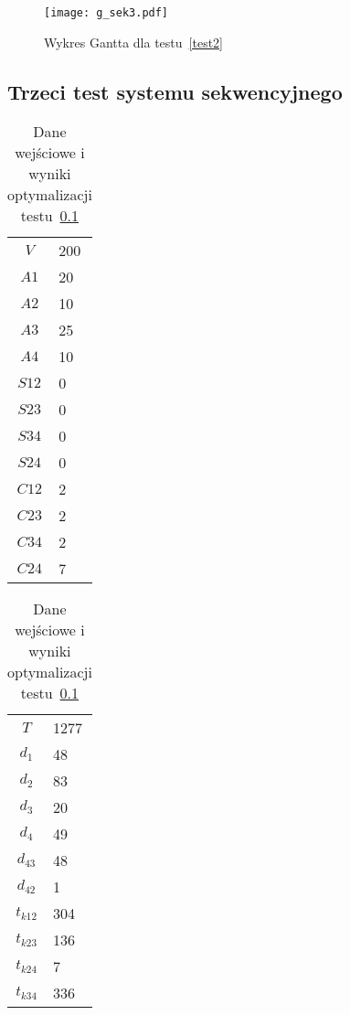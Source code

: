 \begin{figure}[H]
\centering
\texttt{[image: g\_sek3.pdf]}
\caption{Wykres Gantta dla testu~\ref{test2}}
\label{fig:res_2b}
\end{figure}



\subsection{Trzeci test systemu sekwencyjnego} \label{test3}

\begin{table}[H]
\begin{minipage}[b]{0.5\linewidth}
\centering
\begin{tabular}{c l}
$V$ & 200 \\
$A1$ & 20 \\
$A2$ & 10 \\
$A3$ & 25 \\
$A4$ & 10 \\
$S12$ & 0 \\
$S23$ & 0 \\
$S34$ & 0 \\
$S24$ & 0 \\
$C12$ & 2 \\
$C23$ & 2 \\
$C34$ & 2 \\
$C24$ & 7 \\
\end{tabular}
\end{minipage}
\hspace{0.5cm}
\begin{minipage}[b]{0.5\linewidth}
\centering
\begin{tabular}{c l}
$T$ & 1277 \\
$d_{1}$ & 48 \\
$d_{2}$ & 83 \\
$d_{3}$ & 20 \\
$d_{4}$ & 49 \\
$d_{43}$ & 48 \\
$d_{42}$ & 1 \\
$t_{k12}$ & 304 \\
$t_{k23}$ & 136 \\
$t_{k24}$ & 7 \\
$t_{k34}$ & 336 \\
\end{tabular}
\end{minipage}
\caption{Dane wejściowe i wyniki optymalizacji testu~\ref{test3}}
\label{tab:res_3a}
\end{table}

